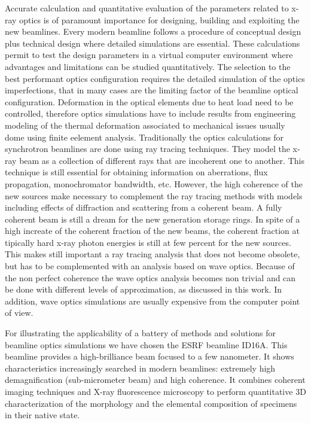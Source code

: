 \documentclass{iucr}              %
\begin{document}
Accurate calculation and quantitative evaluation of the parameters related to x-ray optics is of paramount importance for designing, building and exploiting the new beamlines. Every modern beamline follows a procedure of conceptual design plus technical design where detailed simulations are essential. These calculations permit to test the design parameters in a virtual computer environment where advantages and limitations can be studied quantitatively. The selection to the best performant optics configuration requires the detailed simulation of the optics imperfections, that in many cases are the limiting factor of the beamline optical configuration. Deformation in the optical elements due to heat load need to be controlled, therefore optics simulations have to include results from engineering modeling of the thermal deformation associated to mechanical issues usually dome using finite eelement analysis. Traditionally the optics calculations for synchrotron beamlines are done using ray tracing techniques. They model the x-ray beam as a collection of different rays that are incoherent one to another. This technique is still essential for obtaining information on aberrations, flux propagation, monochromator bandwidth, etc. However, the high coherence of the new sources make necessary to complement the ray tracing methods with models including effects of diffraction and scattering from a coherent beam. A fully coherent beam is still a dream for the new generation storage rings. In spite of a high increate of the coherent fraction of the new beams, the coherent fraction at tipically hard x-ray photon energies is still at few percent for the new sources. This makes still important a ray tracing analysis that does not become obsolete, but has to be complemented with an analysis based on wave optics. Because of the non perfect coherence the wave optics analysis becomes non trivial and can be done with different levels of approximation, as discussed in this work. In addition, wave optics simulations are usually expensive from the computer point of view.

For illustrating the applicability of a battery of methods and solutions for beamline optics simulations we have chosen the ESRF beamline ID16A. This beamline provides a high-brilliance beam focused to a few nanometer. It shows characteristics increasingly searched in modern beamlines: extremely high demagnification (sub-micrometer beam) and high coherence. It combines coherent imaging techniques and X-ray fluorescence microscopy to perform quantitative 3D characterization of the morphology and the elemental composition of specimens in their native state. 
\end{document}
